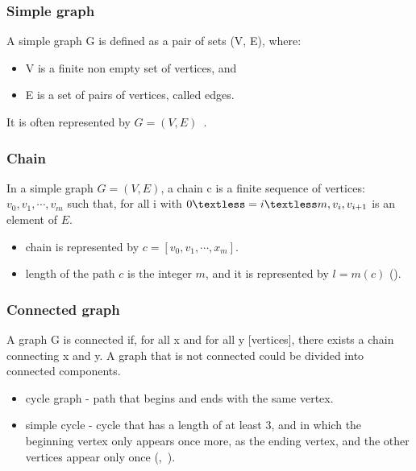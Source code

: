 \subsubsection*{Simple graph}
A simple graph G is defined as a pair of sets (V, E), where:
\begin{itemize}\addtolength{\itemsep}{-0.5\baselineskip}\vspace{-7mm}
\item V is a finite non empty set of vertices, and
\item E is a set of pairs of vertices, called edges. 
\end{itemize}\vspace{-5mm}
It is often represented by $G = (V, E)$~\cite{graph}.

\subsubsection*{Chain}
In a simple graph $G = (V, E)$, a chain c is a finite sequence of vertices: $v_{0}, v_{1}, \cdots , v_{m}$ such that, for all i with $0 \textless= i \textless m, v_{i}, v_{i + 1}$ is an element of $E$.
\begin{itemize}\addtolength{\itemsep}{-0.5\baselineskip}\vspace{-7mm}
\item chain is represented by $c = [v_{0}, v_{1}, \cdots , x_{m}]$.
\item length of the path $c$ is the integer $m$, and it is represented by $l = m(c)$ (\cite{alain}).
\end{itemize}

\subsubsection*{Connected graph}
A graph G is connected if, for all x and for all y [vertices], there exists a chain connecting x and y.  A graph that is not connected could be divided into connected components.

\begin{itemize}\addtolength{\itemsep}{-0.5\baselineskip}\vspace{-7mm}
\item cycle graph - path that begins and ends with the same vertex.
\item simple cycle - cycle that has a length of at least 3, and in which the beginning vertex only appears once more, as the ending vertex, and the other vertices appear only once (\cite{alain},~\cite{graph}).
\end{itemize}

